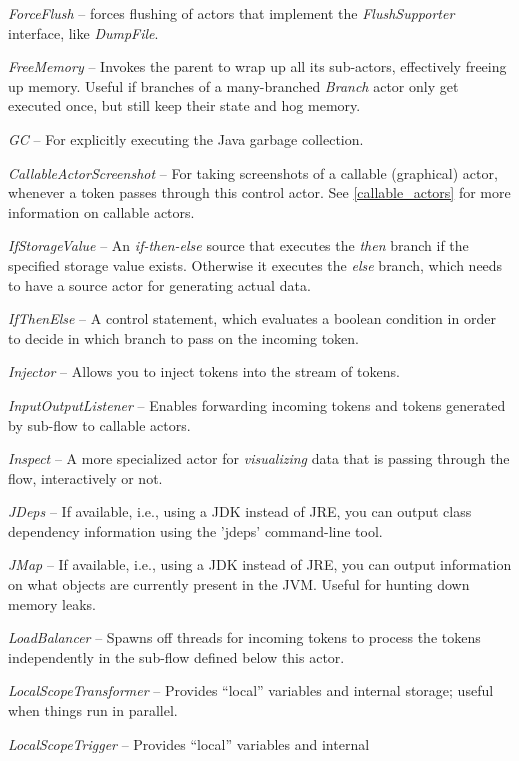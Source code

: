 \begin{tight_itemize}
	\item \textit{ForceFlush} -- forces flushing of actors that implement
	the \textit{FlushSupporter} interface, like \textit{DumpFile}.
	\item \textit{FreeMemory} -- Invokes the parent to wrap up all its
	sub-actors, effectively freeing up memory. Useful if branches of a
	many-branched \textit{Branch} actor only get executed once, but still keep
	their state and hog memory.
	\item \textit{GC} -- For explicitly executing the Java garbage collection.
	\item \textit{CallableActorScreenshot} -- For taking screenshots of a callable
	(graphical) actor, whenever a token passes through this control actor.
	See \ref{callable_actors} for more information on callable actors.
	\item \textit{IfStorageValue} -- An \textit{if-then-else} source that executes
	the \textit{then} branch if the specified storage value exists. Otherwise it
	executes the \textit{else} branch, which needs to have a source actor for
	generating actual data.
	\item \textit{IfThenElse} -- A control statement, which evaluates a boolean
	condition in order to decide in which branch to pass on the incoming token.
	\item \textit{Injector} -- Allows you to inject tokens into the stream of
	tokens.
	\item \textit{InputOutputListener} -- Enables forwarding incoming tokens
	and tokens generated by sub-flow to callable actors.
	\item \textit{Inspect} -- A more specialized actor for \textit{visualizing} data
	that is passing through the flow, interactively or not.
	\item \textit{JDeps} -- If available, i.e., using a JDK instead of JRE, you can
	output class dependency information using the 'jdeps' command-line tool.
	\item \textit{JMap} -- If available, i.e., using a JDK instead of JRE, you can
	output information on what objects are currently present in the JVM. Useful for
	hunting down memory leaks.
	\item \textit{LoadBalancer} -- Spawns off threads for incoming tokens to
	process the tokens independently in the sub-flow defined below this actor.
	\item \textit{LocalScopeTransformer} -- Provides ``local'' variables and internal
	storage; useful when things run in parallel.
	\item \textit{LocalScopeTrigger} -- Provides ``local'' variables and internal

\end{tight_itemize}
